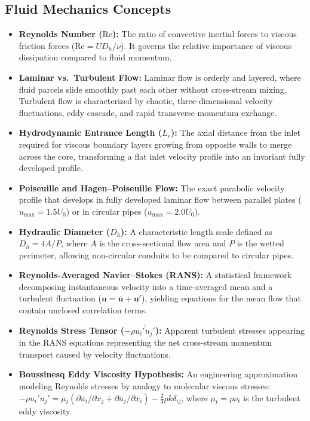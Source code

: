 \documentclass[11pt,a4paper]{article}
\begin{document}
\subsection{Fluid Mechanics Concepts}
\begin{itemize}[leftmargin=1.5em]
    \item \textbf{Reynolds Number ($\mathrm{Re}$):} The ratio of convective inertial forces to viscous friction forces ($\mathrm{Re} = U D_h / \nu$). It governs the relative importance of viscous dissipation compared to fluid momentum.
    \item \textbf{Laminar vs.\ Turbulent Flow:} Laminar flow is orderly and layered, where fluid parcels slide smoothly past each other without cross-stream mixing. Turbulent flow is characterized by chaotic, three-dimensional velocity fluctuations, eddy cascade, and rapid transverse momentum exchange.
    \item \textbf{Hydrodynamic Entrance Length ($L_e$):} The axial distance from the inlet required for viscous boundary layers growing from opposite walls to merge across the core, transforming a flat inlet velocity profile into an invariant fully developed profile.
    \item \textbf{Poiseuille and Hagen--Poiseuille Flow:} The exact parabolic velocity profile that develops in fully developed laminar flow between parallel plates ($u_{\max} = 1.5 U_0$) or in circular pipes ($u_{\max} = 2.0 U_0$).
    \item \textbf{Hydraulic Diameter ($D_h$):} A characteristic length scale defined as $D_h = 4A/P$, where $A$ is the cross-sectional flow area and $P$ is the wetted perimeter, allowing non-circular conduits to be compared to circular pipes.
    \item \textbf{Reynolds-Averaged Navier--Stokes (RANS):} A statistical framework decomposing instantaneous velocity into a time-averaged mean and a turbulent fluctuation ($\mathbf{u} = \overline{\mathbf{u}} + \mathbf{u}'$), yielding equations for the mean flow that contain unclosed correlation terms.
    \item \textbf{Reynolds Stress Tensor ($-\rho \overline{u_i' u_j'}$):} Apparent turbulent stresses appearing in the RANS equations representing the net cross-stream momentum transport caused by velocity fluctuations.
    \item \textbf{Boussinesq Eddy Viscosity Hypothesis:} An engineering approximation modeling Reynolds stresses by analogy to molecular viscous stresses: $-\rho \overline{u_i' u_j'} = \mu_t (\partial \overline{u}_i/\partial x_j + \partial \overline{u}_j/\partial x_i) - \frac{2}{3}\rho k \delta_{ij}$, where $\mu_t = \rho \nu_t$ is the turbulent eddy viscosity.

\end{itemize}
\end{document}
